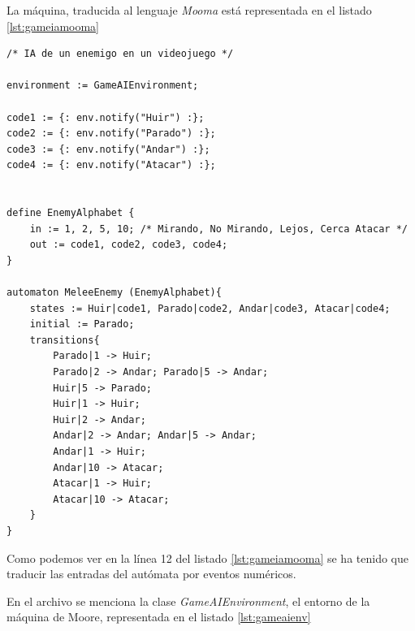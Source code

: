 \documentclass{pre-tfg}
\begin{document}
La máquina, traducida al lenguaje \emph{Mooma} está representada en el listado \ref{lst:gameiamooma}

\begin{lstlisting}[caption=GameIA.moo, label=lst:gameiamooma]
/* IA de un enemigo en un videojuego */

environment := GameAIEnvironment;

code1 := {: env.notify("Huir") :};
code2 := {: env.notify("Parado") :};
code3 := {: env.notify("Andar") :};
code4 := {: env.notify("Atacar") :};


define EnemyAlphabet {
    in := 1, 2, 5, 10; /* Mirando, No Mirando, Lejos, Cerca Atacar */
    out := code1, code2, code3, code4;
}

automaton MeleeEnemy (EnemyAlphabet){
    states := Huir|code1, Parado|code2, Andar|code3, Atacar|code4;
    initial := Parado;
    transitions{
        Parado|1 -> Huir;
        Parado|2 -> Andar; Parado|5 -> Andar;
        Huir|5 -> Parado;
        Huir|1 -> Huir;
        Huir|2 -> Andar;
        Andar|2 -> Andar; Andar|5 -> Andar;
        Andar|1 -> Huir;
        Andar|10 -> Atacar;
        Atacar|1 -> Huir;
        Atacar|10 -> Atacar;
    }
}
\end{lstlisting}

Como podemos ver en la línea 12 del listado \ref{lst:gameiamooma} se ha tenido que traducir las entradas del autómata por eventos numéricos.

En el archivo se menciona la clase \emph{GameAIEnvironment}, el entorno de la máquina de Moore, representada en el listado \ref{lst:gameaienv}
\end{document}
